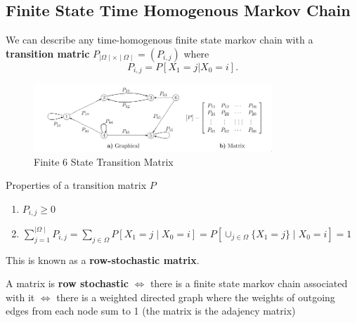 \documentclass[a4paper]{article}
\begin{document}
  \subsection{Finite State Time Homogenous Markov Chain}
  \begin{prop}
    We can describe any time-homogenous finite state markov chain with a \textbf{transition matric} $P_{\mid \Omega \mid \times \mid \Omega \mid } = (P_{i,j})$ where 
    \[
      P_{i,j} = P[X_1 = j | X_0 = i]
    .\] 
  \end{prop}

\begin{figure}[h]
  \centering
  \includegraphics[width=0.8\textwidth]{assets/finite_state_markov_chains.png}
  \caption{Finite 6 State Transition Matrix}
  \label{fig:finite_state_markov_chains}
\end{figure}

\begin{lemma}
  Properties of a transition matrix $P$
  \begin{enumerate}
    \item $P_{i,j} \geq 0$ 
    \item $\sum_{j=1}^{\mid \Omega \mid} P_{i,j} = \sum_{j \in \Omega} P[X_1 = j \mid  X_0 = i] = P[\cup_{j \in \Omega} \{X_1 = j\} \mid X_0 = i]  = 1$
  \end{enumerate}
  This is known as a \textbf{row-stochastic matrix}. 
  \begin{prop}
    A matrix is \textbf{row stochastic} $\iff$ there is a finite state markov chain associated with it $\iff$ there is a weighted directed graph where the weights of outgoing edges from each node sum to 1 (the matrix is the adajency matrix)
  \end{prop}
\end{lemma}
\end{document}
